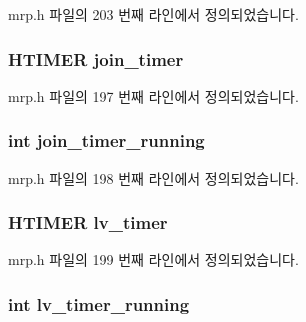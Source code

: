 mrp.\+h 파일의 203 번째 라인에서 정의되었습니다.

\subsubsection[{\texorpdfstring{join\+\_\+timer}{join_timer}}]{\setlength{\rightskip}{0pt plus 5cm}H\+T\+I\+M\+ER join\+\_\+timer}\hypertarget{structmrp__database_a55eea88044cf545b4b60f7a851e2ca4e}{}\label{structmrp__database_a55eea88044cf545b4b60f7a851e2ca4e}


mrp.\+h 파일의 197 번째 라인에서 정의되었습니다.

\subsubsection[{\texorpdfstring{join\+\_\+timer\+\_\+running}{join_timer_running}}]{\setlength{\rightskip}{0pt plus 5cm}int join\+\_\+timer\+\_\+running}\hypertarget{structmrp__database_a83c767737796901ce98b40bac61d3693}{}\label{structmrp__database_a83c767737796901ce98b40bac61d3693}


mrp.\+h 파일의 198 번째 라인에서 정의되었습니다.

\subsubsection[{\texorpdfstring{lv\+\_\+timer}{lv_timer}}]{\setlength{\rightskip}{0pt plus 5cm}H\+T\+I\+M\+ER lv\+\_\+timer}\hypertarget{structmrp__database_afb0e407756ab2688bbd60efbbdcc66d4}{}\label{structmrp__database_afb0e407756ab2688bbd60efbbdcc66d4}


mrp.\+h 파일의 199 번째 라인에서 정의되었습니다.

\subsubsection[{\texorpdfstring{lv\+\_\+timer\+\_\+running}{lv_timer_running}}]{\setlength{\rightskip}{0pt plus 5cm}int lv\+\_\+timer\+\_\+running}\hypertarget{structmrp__database_a9b16e9e1e481156a56686fb632d06263}{}\label{structmrp__database_a9b16e9e1e481156a56686fb632d06263}


